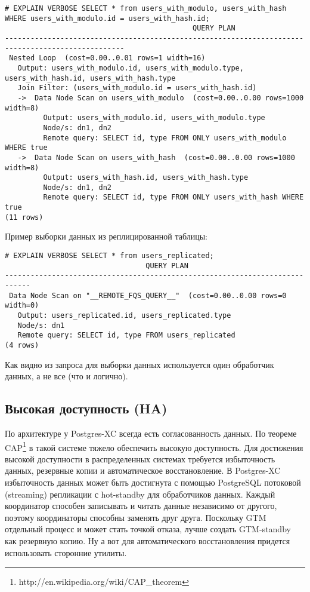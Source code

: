 \begin{lstlisting}[label=lst:postgres-xc8,caption=Выборка записей из распределенной таблицы]
# EXPLAIN VERBOSE SELECT * from users_with_modulo, users_with_hash WHERE users_with_modulo.id = users_with_hash.id;
                                            QUERY PLAN                                            
--------------------------------------------------------------------------------------------------
 Nested Loop  (cost=0.00..0.01 rows=1 width=16)
   Output: users_with_modulo.id, users_with_modulo.type, users_with_hash.id, users_with_hash.type
   Join Filter: (users_with_modulo.id = users_with_hash.id)
   ->  Data Node Scan on users_with_modulo  (cost=0.00..0.00 rows=1000 width=8)
         Output: users_with_modulo.id, users_with_modulo.type
         Node/s: dn1, dn2
         Remote query: SELECT id, type FROM ONLY users_with_modulo WHERE true
   ->  Data Node Scan on users_with_hash  (cost=0.00..0.00 rows=1000 width=8)
         Output: users_with_hash.id, users_with_hash.type
         Node/s: dn1, dn2
         Remote query: SELECT id, type FROM ONLY users_with_hash WHERE true
(11 rows)
\end{lstlisting}

Пример выборки данных из реплицированной таблицы:

\begin{lstlisting}[label=lst:postgres-xc22,caption=Выборка записей из реплицированной таблицы]
# EXPLAIN VERBOSE SELECT * from users_replicated;
                                 QUERY PLAN                                 
----------------------------------------------------------------------------
 Data Node Scan on "__REMOTE_FQS_QUERY__"  (cost=0.00..0.00 rows=0 width=0)
   Output: users_replicated.id, users_replicated.type
   Node/s: dn1
   Remote query: SELECT id, type FROM users_replicated
(4 rows)
\end{lstlisting}

Как видно из запроса для выборки данных используется один обработчик данных, а не все (что и логично).

\subsection{Высокая доступность (HA)}

По архитектуре у Postgres-XC всегда есть согласованность данных. По теореме CAP\footnote{http://en.wikipedia.org/wiki/CAP\_theorem} в такой системе тяжело обеспечить высокую доступность. Для достижения высокой доступности в распределенных системах требуется избыточность данных, резервные копии и автоматическое восстановление. В Postgres-XC избыточность данных может быть достигнута с помощью PostgreSQL потоковой (streaming) репликации с hot-standby для обработчиков данных. Каждый координатор способен записывать и читать данные независимо от другого, поэтому координаторы способны заменять друг друга. Поскольку GTM отдельный процесс и может стать точкой отказа, лучше создать GTM-standby как резервную копию. Ну а вот для автоматического восстановления придется использовать сторонние утилиты.

